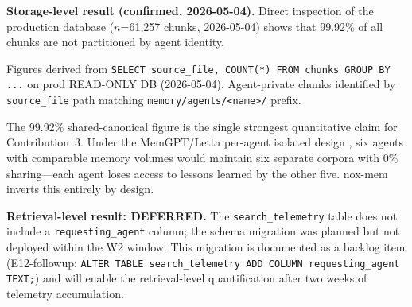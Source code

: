 \textbf{Storage-level result (confirmed, 2026-05-04).} Direct inspection of the production
database ($n$=61,257 chunks, 2026-05-04) shows that 99.92\% of all chunks are not
partitioned by agent identity.

\begin{table}[t]
  \caption{Cross-agent storage quantification ($n$=61,257 chunks, prod DB, 2026-05-04).}
  \label{tab:crossagent}
  \centering
  \begin{minipage}{\linewidth}
    \vspace{4pt}\footnotesize
    Figures derived from \texttt{SELECT source\_file, COUNT(*) FROM chunks GROUP BY ...} on
    prod READ-ONLY DB (2026-05-04). Agent-private chunks identified by \texttt{source\_file}
    path matching \texttt{memory/agents/<name>/} prefix.
  \end{minipage}
\end{table}

The 99.92\% shared-canonical figure is the single strongest quantitative claim for
Contribution~3. Under the MemGPT/Letta per-agent isolated design \cite{packer2023memgpt},
six agents with comparable memory volumes would maintain six separate corpora with 0\%
sharing---each agent loses access to lessons learned by the other five. nox-mem inverts
this entirely by design.

\textbf{Retrieval-level result: DEFERRED.} The \texttt{search\_telemetry} table does not
include a \texttt{requesting\_agent} column; the schema migration was planned but not
deployed within the W2 window. This migration is documented as a backlog item
(E12-followup: \texttt{ALTER TABLE search\_telemetry ADD COLUMN requesting\_agent TEXT;})
and will enable the retrieval-level quantification after two weeks of telemetry
accumulation.

